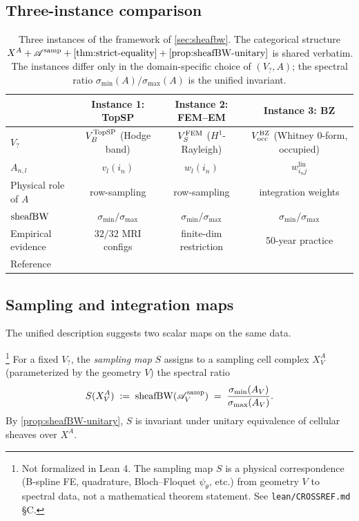\subsection{Three-instance comparison}\label{subsec:6-table}

\begin{table}[h]
\centering
\begin{tabular}{lccc}
\toprule
& \textbf{Instance 1: TopSP} & \textbf{Instance 2: FEM--EM} & \textbf{Instance 3: BZ} \\
\midrule
$V_?$              & $V_B^{\mathrm{TopSP}}$ (Hodge band)     & $V_S^{\mathrm{FEM}}$ ($H^1$-Rayleigh)   & $V_{\mathrm{occ}}^{\mathrm{BZ}}$ (Whitney $0$-form, occupied) \\
$A_{n,l}$          & $v_l(i_n)$                       & $w_l(i_n)$                        & $w_{i_n j}^{\mathrm{lin}}$ \\
Physical role of $A$ & row-sampling                   & row-sampling                      & integration weights \\
$\operatorname{sheafBW}$         & $\sigma_{\min}/\sigma_{\max}$    & $\sigma_{\min}/\sigma_{\max}$     & $\sigma_{\min}/\sigma_{\max}$ \\
Empirical evidence & $32/32$ MRI configs              & finite-dim restriction            & 50-year practice \\
Reference          & \cite{BarbarossaSardellitti2020} & \cite{AFW2010,Whitney1957}        & \cite{Blochl1994,LehmannTaut1972} \\
\bottomrule
\end{tabular}
\caption{Three instances of the framework of \cref{sec:sheafbw}. The
  categorical structure $X^A + \samps + \cref{thm:strict-equality} +
  \cref{prop:sheafBW-unitary}$ is shared verbatim. The instances differ
  only in the domain-specific choice of $(V_?, A)$; the spectral ratio
  $\sigma_{\min}(A)/\sigma_{\max}(A)$ is the unified invariant.}
\label{tab:6-instances}
\end{table}

\subsection{Sampling and integration maps}\label{subsec:6-maps}

The unified description suggests two scalar maps on the same data.

\begin{definition}\label{def:sampling-map}\footnote{Not formalized in Lean 4. The sampling map $S$ is a physical correspondence (B-spline FE, quadrature, Bloch--Floquet $\psi_\theta$, etc.) from geometry $V$ to spectral data, not a mathematical theorem statement. See \texttt{lean/CROSSREF.md} \S C.}
For a fixed $V_?$, the \emph{sampling map} $S$ assigns to a sampling
cell complex $X^A_V$ (parameterized by the geometry $V$) the spectral
ratio
\[
  S(X^A_V)
  \;:=\;
  \operatorname{sheafBW}(\mathscr{A}^{\mathrm{samp}}_V)
  \;=\;
  \frac{\sigma_{\min}(A_V)}{\sigma_{\max}(A_V)}.
\]
By \cref{prop:sheafBW-unitary}, $S$ is invariant under unitary
equivalence of cellular sheaves over $X^A$.
\end{definition}

